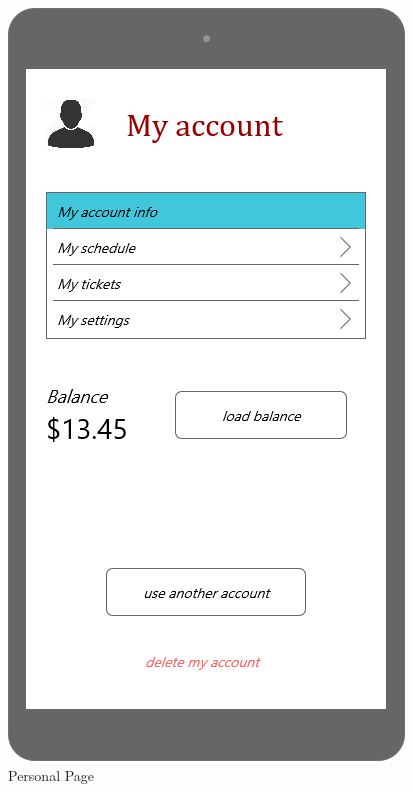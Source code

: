 \documentclass{article}
\begin{document}
\begin{figure}[H]
  \includegraphics[width=\linewidth]{02-Personal_page.png}
  \caption{Personal Page}\label{fig:MU11}
\endminipage\hfill
{}

\end{figure}
\end{document}
